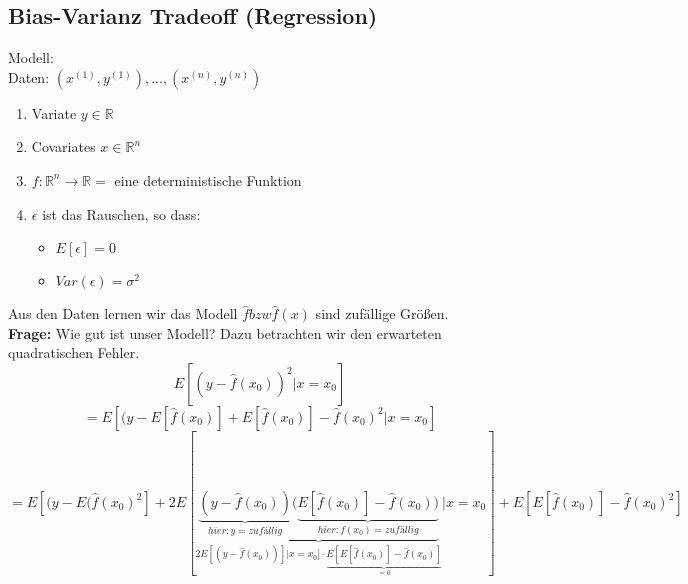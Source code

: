 \subsection{Bias-Varianz Tradeoff (Regression)}
Modell: \\
Daten: $(x^{(1)},y^{(1)}),...,(x^{(n)},y^{(n)})$\\
\begin{enumerate}
\item Variate   $y \in \mathbb{R}$
\item Covariates    $x \in \mathbb{R}^n$
\item $f: \mathbb{R}^n \rightarrow \mathbb{R} =$ eine deterministische Funktion
\item $\epsilon$ ist das Rauschen, so dass:
\begin{itemize}
\item $E[\epsilon] = 0$
\item $Var(\epsilon) = \sigma^2$
\end{itemize}
\end{enumerate}
Aus den Daten lernen wir das Modell $\hat{f} bzw \hat{f}(x)$ sind zufällige Größen.\\
\textbf{Frage:} Wie gut ist unser Modell? Dazu betrachten wir den erwarteten quadratischen Fehler.
$$E[(y-\hat{f}(x_0))^2 | x = x_0] $$
$$= E[(y-E[\hat{f}(x_0)] + E[\hat{f}(x_0)] - \hat{f}(x_0)^2 | x = x_0] $$
$$= E[(y-E(\hat{f}(x_0)^2] + 2E[
\underbrace{
\underbrace{(y-\hat{f}(x_0))}_{hier: y = zufällig}(\underbrace{E[\hat{f}(x_0)]-\hat{f}(x_0))}_{hier: f(x_0) = zufällig}}_{2E[(y-\hat{f}(x_0))] | x = x_0] \cdot \underbrace{E[E[\hat{f}(x_0)]-\hat{f}(x_0)]}_{=0}} | x = x_0] + E[E[\hat{f}(x_0)]-\hat{f}(x_0)^2]$$
